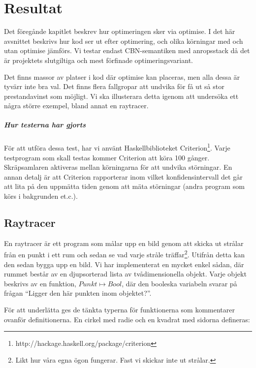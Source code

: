 \documentclass[Rapport]{subfiles}
\begin{document}
\chapter{Resultat}
\label{sec:Resultat}


Det föregånde kapitlet beskrev hur optimeringen sker via optimise.
I det här avsnittet beskrivs hur kod ser ut efter optimering, och 
olika körningar med och utan optimise jämförs. 
Vi testar endast CBN-semantiken med anropsstack då det är projektets 
slutgiltiga och mest förfinade optimeringsvariant.

Det finns massor av platser i kod där optimise kan placeras, men alla dessa är tyvärr 
inte bra val. Det finns flera fallgropar att undvika för få ut så stor 
prestandavinst som möjligt. Vi ska illusterara detta igenom att undersöka ett 
några större exempel, bland annat en raytracer.

\paragraph{Hur testerna har gjorts}
För att utföra dessa test, har vi använt Haskellbiblioteket Criterion\footnote{http://hackage.haskell.org/package/criterion}.
Varje testprogram som skall testas kommer Criterion att köra 100 gånger. Skräpsamlaren
aktiveras mellan körningarna för att undvika störningar.
En annan detalj är att Criterion 
rapporterar inom vilket konfidensintervall det går att lita
på den uppmätta tiden genom att
mäta störningar (andra program som körs
i bakgrunden et.c.).


\section{Raytracer}


En raytracer är ett program som målar upp en bild genom att skicka ut strålar från en punkt
i ett rum och sedan se vad varje stråle träffar\footnote{Likt hur 
våra egna ögon fungerar. Fast vi skickar inte ut strålar.}.
Utifrån detta kan den sedan bygga upp en bild. Vi har implementerat
en mycket enkel sådan, där rummet består av en djupsorterad lista av tvådimensionella objekt.
Varje objekt beskrivs av en funktion, $Punkt \mapsto Bool$, där den booleska
variabeln svarar på frågan ``Ligger den här punkten inom objektet?''.

För att underlätta ges de tänkta typerna för funktionerna som kommentarer ovanför definitionerna.
En cirkel med radie  och en kvadrat med sidorna  defineras:
\end{document}
